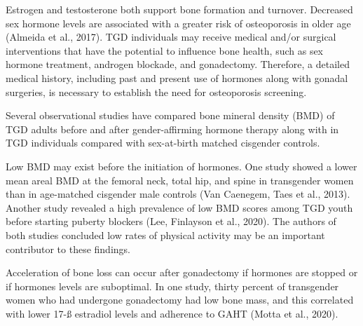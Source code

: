 \documentclass[
]{book}
\begin{document}
Estrogen and testosterone both support bone
formation and turnover. Decreased sex hormone
levels are associated with a greater risk of osteoporosis in older age (Almeida et al., 2017). TGD
individuals may receive medical and/or surgical
interventions that have the potential to influence
bone health, such as sex hormone treatment,
androgen blockade, and gonadectomy. Therefore,
a detailed medical history, including past and
present use of hormones along with gonadal surgeries, is necessary to establish the need for osteoporosis screening.

Several observational studies have compared
bone mineral density (BMD) of TGD adults
before and after gender-affirming hormone therapy along with in TGD individuals compared
with sex-at-birth matched cisgender controls.

Low BMD may exist before the initiation of
hormones. One study showed a lower mean areal
BMD at the femoral neck, total hip, and spine
in transgender women than in age-matched cisgender male controls (Van Caenegem, Taes et al.,
2013). Another study revealed a high prevalence
of low BMD scores among TGD youth before
starting puberty blockers (Lee, Finlayson et al.,
2020). The authors of both studies concluded low
rates of physical activity may be an important
contributor to these findings.

Acceleration of bone loss can occur after gonadectomy if hormones are stopped or if hormones
levels are suboptimal. In one study, thirty percent
of transgender women who had undergone gonadectomy had low bone mass, and this correlated
with lower 17-ß estradiol levels and adherence
to GAHT (Motta et al., 2020).
\end{document}
